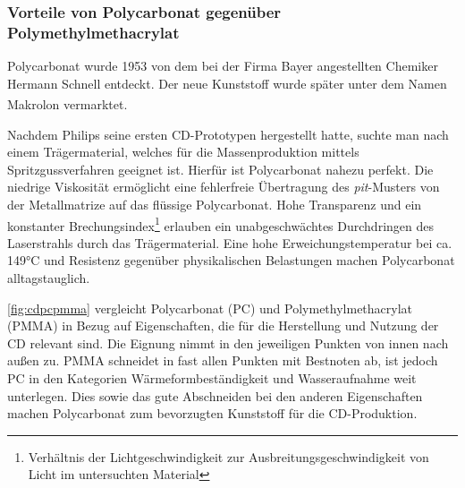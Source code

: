 \subsubsection{Vorteile von Polycarbonat gegenüber Polymethylmethacrylat}

Polycarbonat wurde 1953 von dem bei der Firma Bayer angestellten Chemiker
Hermann Schnell entdeckt. Der neue Kunststoff wurde später unter dem Namen
Makrolon\textsuperscript{\textregistered} vermarktet. \cite{cuzpc}

Nachdem Philips seine ersten CD-Prototypen hergestellt hatte, suchte man nach
einem Trägermaterial, welches für die Massenproduktion mittels
Spritzgussverfahren geeignet ist. Hierfür ist Polycarbonat nahezu perfekt. Die
niedrige Viskosität ermöglicht eine fehlerfreie Übertragung des
\textit{pit}-Musters von der Metallmatrize auf das flüssige Polycarbonat. Hohe
Transparenz und ein konstanter Brechungsindex\footnote{Verhältnis der
Lichtgeschwindigkeit zur Ausbreitungsgeschwindigkeit von Licht im untersuchten
Material} erlauben ein unabgeschwächtes Durchdringen des Laserstrahls durch das
Trägermaterial. Eine hohe Erweichungstemperatur bei ca. 149°C \cite{cuzpc2} und
Resistenz gegenüber physikalischen Belastungen machen Polycarbonat
alltagstauglich. \cite{cfcd}

\autoref{fig:cdpcpmma} vergleicht Polycarbonat (PC) und Polymethylmethacrylat
(PMMA) in Bezug auf Eigenschaften, die für die Herstellung und Nutzung der CD
relevant sind. Die Eignung nimmt in den jeweiligen Punkten von innen nach außen
zu. PMMA schneidet in fast allen Punkten mit Bestnoten ab, ist jedoch PC in den
Kategorien Wärmeformbeständigkeit und Wasseraufnahme weit unterlegen. Dies sowie
das gute Abschneiden bei den anderen Eigenschaften machen Polycarbonat zum
bevorzugten Kunststoff für die CD-Produktion.

